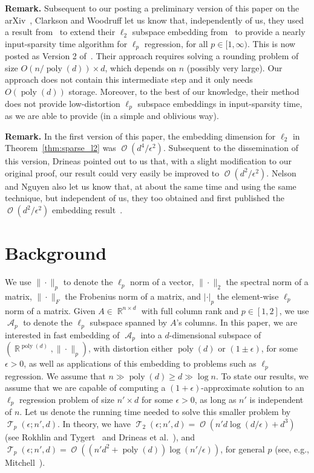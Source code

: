 \documentclass[11pt]{article}
\DeclareMathOperator{\poly}{poly}
\DeclareMathOperator{\bigO}{\mathcal{O}}
\DeclareMathOperator{\A}{\mathcal{A}}
\DeclareMathOperator{\R}{\mathbb{R}}
\DeclareMathOperator{\T}{\mathcal{T}}
\begin{document}
\bigskip

\textbf{Remark.}
Subsequent to our posting a preliminary version of this paper on the
arXiv~\cite{MM12_TR}, Clarkson and Woodruff let us know that, independently of
us, they used a result from~\cite{CDMMMW13_SODA} to extend their $\ell_2$
subspace embedding from~\cite{CW12sparse_TR} to provide a nearly input-sparsity
time algorithm for $\ell_p$ regression, for all $p\in[1,\infty)$.
This is now posted as Version 2 of~\cite{CW12sparse_TR}.
Their approach requires solving a rounding problem of size $O(n/\poly(d)) \times
d$, which depends on $n$ (possibly very large).
Our approach does not contain this intermediate step and it only needs
$O(\poly(d))$ storage.
Moreover, to the best of our knowledge, their method does not provide
low-distortion $\ell_p$ subspace embeddings in input-sparsity time, as we are
able to provide (in a simple and oblivious way).

\textbf{Remark.}
In the first version of this paper, the embedding dimension for $\ell_2$ in
Theorem~\ref{thm:sparse_l2} was $\bigO(d^4/\epsilon^2)$.
Subsequent to the dissemination of this version, Drineas pointed out to us that,
with a slight modification to our original proof, our result could very easily
be improved to $\bigO(d^2/\epsilon^2)$.
Nelson and Nguyen also let us know that, at about the same time and using the
same technique, but independent of us, they too obtained and first published the
$\bigO(d^2/\epsilon^2)$ embedding result~\cite{nelson2012osnap}.

\section{Background}
\label{sxn:lbackground} 

We use $\|\cdot\|_p$ to denote the $\ell_p$ norm of a vector, $\|\cdot\|_2$ the
spectral norm of a matrix, $\|\cdot\|_F$ the Frobenius norm of a matrix, and
$|\cdot|_p$ the element-wise $\ell_p$ norm of a matrix.
Given $A \in \R^{n \times d}$ with full column rank and $p \in [1, 2]$, we 
use $\A_p$ to denote the $\ell_p$ subspace spanned by $A$'s columns.
In this paper, we are interested in fast embedding of $\A_p$ into a
$d$-dimensional subspace of $(\R^{\poly(d)}, \|\cdot\|_p)$, with distortion
either $\poly(d)$ or $(1\pm\epsilon)$, for some $\epsilon > 0$, as well as
applications of this embedding to problems such as $\ell_p$ regression.
We assume that $n \gg \poly(d) \geq d \gg \log n$.
To state our results, we assume that we are capable of computing a
$(1+\epsilon)$-approximate solution to an $\ell_p$ regression problem of size
$n' \times d$ for some $\epsilon > 0$, as long as $n'$ is independent of $n$.
Let us denote the running time needed to solve this smaller problem by
$\T_p(\epsilon; n', d)$.
In theory, we have $\T_2(\epsilon; n', d) = \bigO(n' d \log (d/\epsilon) + d^3)$
(see Rokhlin and Tygert~\cite{RT08} and Drineas et 
al.~\cite{DMMS07_FastL2_NM10}), and $\T_p(\epsilon; n', d) =
\bigO((n' d^2 + \poly(d)) \log(n'/\epsilon))$, for general $p$ (see, e.g.,
Mitchell~\cite{mitchell2003polynomial}).
\end{document}
